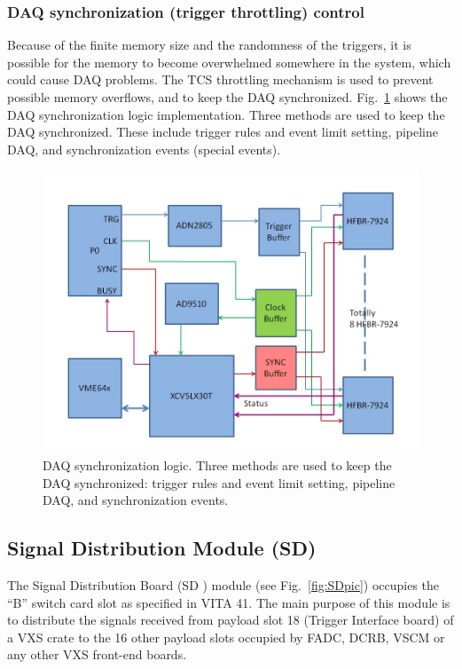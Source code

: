\subsubsection{DAQ synchronization (trigger throttling) control}

Because of the finite memory size and the randomness of the triggers, it is possible for the memory to become overwhelmed somewhere in the system, which could cause DAQ problems.   The TCS throttling mechanism is used to prevent possible memory overflows, and to keep the DAQ synchronized.  Fig.~\ref{fig:DAQ_synchronization} shows the DAQ synchronization logic implementation.  Three methods are used to keep the DAQ synchronized.  These include trigger rules and event limit setting, pipeline DAQ, and synchronization events (special events).

\begin{figure}[hbt]
	\centering
	\includegraphics[width=1.0\columnwidth,keepaspectratio]{img/TDdiagram.jpg}
	\caption{DAQ synchronization logic. Three methods are used to keep the DAQ synchronized: trigger rules and event limit setting, pipeline DAQ, and synchronization events.}
	\label{fig:DAQ_synchronization}
\end{figure}

	
\subsection{Signal Distribution Module (SD)}

The Signal Distribution Board (SD \cite{sd-ref}) module (see Fig.~\ref{fig:SDpic}) occupies the “B” switch card slot as specified in VITA 41. The main purpose of this module is to distribute the signals received from payload slot 18 (Trigger Interface board) of a VXS crate to the 16 other payload slots occupied by FADC, DCRB, VSCM or any other VXS front-end boards.


